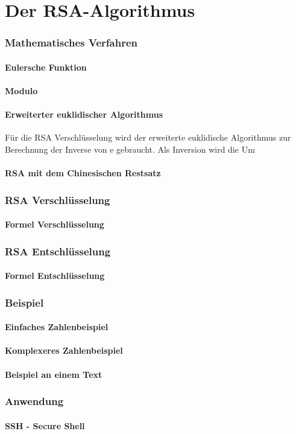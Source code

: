 \part{Der RSA-Algorithmus}
\section{Mathematisches Verfahren}
\subsection{Eulersche Funktion}
\subsection{Modulo}
\subsection{Erweiterter euklidischer Algorithmus}
Für die RSA Verschlüsselung wird der erweiterte euklidische Algorithmus zur Berechnung der Inverse von e gebraucht. Als Inversion wird die Um
\subsection{RSA mit dem Chinesischen Restsatz}


\section{RSA Verschlüsselung}
\subsection{Formel Verschlüsselung}
\section{RSA Entschlüsselung}
\subsection{Formel Entschlüsselung}
\section{Beispiel}
\subsection{Einfaches Zahlenbeispiel}
\subsection{Komplexeres Zahlenbeispiel}
\subsection{Beispiel an einem Text}
\section{Anwendung}
\subsection{SSH - Secure Shell}
